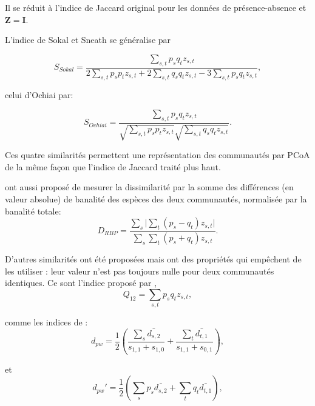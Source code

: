 \documentclass[
  11pt,
  french,
  a4paper,
  extrafontsizes,onecolumn,openright
  ]{memoir}
\begin{document}
Il se réduit à l'indice de Jaccard original pour les données de présence-absence et \(\mathbf{Z} = \mathbf{I}\).

L'indice de Sokal et Sneath se généralise par

\begin{equation}
  \label{eq:SokalAbd}
  S_{\mathit{Sokal}} = \frac{\sum_{s,t}{p_s q_t z_{s,t}}}{2 \sum_{s,t}{p_s p_t z_{s,t}} + 2 \sum_{s,t}{q_s q_t z_{s,t}} - 3 \sum_{s,t}{p_s q_t z_{s,t}}},
\end{equation}

celui d'Ochiai par:

\begin{equation}
  \label{eq:OchiaiAbd}
  S_{\mathit{Ochiai}} = \frac{\sum_{s,t}{p_s q_t z_{s,t}}}{\sqrt{\sum_{s,t}{p_s p_t z_{s,t}}} \sqrt{\sum_{s,t}{q_s q_t z_{s,t}}}}.
\end{equation}

Ces quatre similarités permettent une représentation des communautés par PCoA de la même façon que l'indice de Jaccard traité plus haut.

\textcite{Ricotta2014b} ont aussi proposé de mesurer la dissimilarité par la somme des différences (en valeur absolue) de banalité des espèces des deux communautés, normalisée par la banalité totale:
\begin{equation}
  \label{eq:Ricotta2014b}
  D_{\mathit{RBP}} 
  = \frac{\sum_{s}{|\sum_{t}{(p_s-q_t)z_{s,t}}}|}{\sum_{s}{\sum_{t}{(p_s+q_t)z_{s,t}}}}.
\end{equation}

D'autres similarités ont été proposées mais ont des propriétés qui empêchent de les utiliser \autocite{Ricotta2014b}: leur valeur n'est pas toujours nulle pour deux communautés identiques.
Ce sont l'indice proposé par \textcite{Rao1982},
\begin{equation}
  \label{eq:Rao1982Q12}
  Q_{\mathit{12}} = \sum_{s,t}{p_s q_t z_{s,t}},
\end{equation}

comme les indices de \textcite{Swenson2011}:
\begin{equation}
  \label{eq:Swenson2011a}
  d_{\mathit{pw}} = \frac{1}{2}\left( \frac{\sum_s{\bar{d_{s,2}}}}{s_{1,1}+s_{1,0}} + \frac{\sum_t{\bar{d_{t,1}}}}{s_{1,1}+s_{0,1}} \right),
\end{equation}

et
\begin{equation}
  \label{eq:Swenson2011b}
  d_{\mathit{pw}}' = \frac{1}{2}\left( \sum_s{p_s\bar{d_{s,2}}} + \sum_t{q_t\bar{d_{t,1}}} \right), 
\end{equation}
\end{document}
